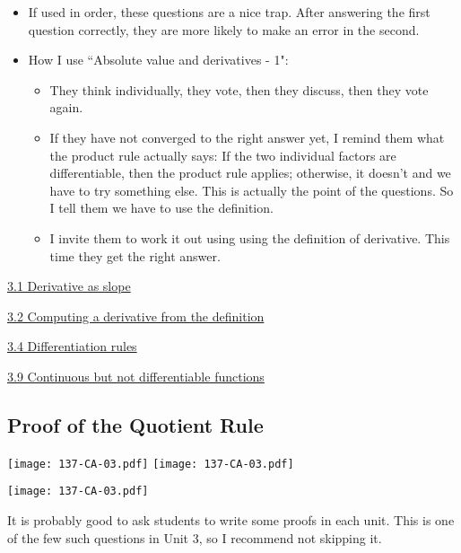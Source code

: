 \documentclass[11pt]{article}
\newcommand{\nl}{\hfill \vspace{-1.1\baselineskip}} %
\newcommand{\vi}{\hspace{8mm} \href{https://www.youtube.com/watch?v=7vhux5TLRmQ&list=PLlwePzQY_wW8qiZD6XYqCnibdY37ygbx7&index=1}{3.1 Derivative as slope}}
\newcommand{\vii}{\hspace{8mm} \href{https://www.youtube.com/watch?v=eNcg9cKzV1Q&list=PLlwePzQY_wW8qiZD6XYqCnibdY37ygbx7&index=2}{3.2 Computing a derivative from the definition}}
\newcommand{\viv}{\hspace{8mm} \href{https://www.youtube.com/watch?v=k_VxtK1U9jk&list=PLlwePzQY_wW8qiZD6XYqCnibdY37ygbx7&index=4}{3.4 Differentiation rules}}
\newcommand{\vix}{\hspace{8mm} \href{https://www.youtube.com/watch?v=QBmUyi64zf8&list=PLlwePzQY_wW8qiZD6XYqCnibdY37ygbx7&index=9}{3.9 Continuous but not differentiable functions}}
\begin{document}
\begin{comments}
\nl
	\begin{itemize}
		\item  If used in order, these questions are a nice trap.  After answering the first question correctly, they are more likely to make an error in the second.
		\item How I use ``Absolute value and derivatives - 1":
			\begin{itemize}
				\item  They think individually, they vote, then they discuss, then they vote again.
				\item If they have not converged to the right answer yet, I remind them what the product rule actually says: If the two individual factors are differentiable, then the product rule applies; otherwise, it doesn't and we have to try something else.  This is actually the point of the questions.  So I tell them we have to use the definition.
				\item I invite them to work it out using using the definition of derivative.  This time they get the right answer.
			\end{itemize}
	\end{itemize}	
\end{comments}

\begin{videos}
\vi 

\vii

\viv

\vix
\end{videos}

\newpage


\subsection{Proof of the Quotient Rule} 

\begin{center}
{ \texttt{[image: 137-CA-03.pdf]}} \quad
{ \texttt{[image: 137-CA-03.pdf]}} 

{ \texttt{[image: 137-CA-03.pdf]}} 
\end{center}


\begin{warning}
	It is probably good to ask students to write some proofs in each unit.  This is one of the few such questions in Unit 3, so I recommend not skipping it.
\end{warning}
\end{document}
